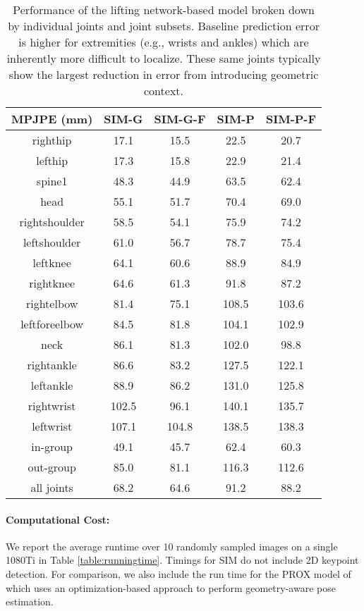 \documentclass[times,referee,twocolumn,final,authoryear]{elsarticle}
\begin{document}
\begin{table}[t]
\small
\begin{center}
\begin{tabular}{c|c|c||c|c}
\hline
MPJPE (mm)   & SIM-G & SIM-G-F & SIM-P & SIM-P-F \\
\hline
righthip & 17.1 & 15.5 & 22.5 & 20.7 \\
\hline
lefthip & 17.3 & 15.8 & 22.9 & 21.4  \\
\hline
spine1 & 48.3 & 44.9 & 63.5 & 62.4  \\
\hline
head & 55.1 & 51.7 & 70.4 & 69.0  \\
\hline
rightshoulder & 58.5 & 54.1 & 75.9 & 74.2   \\
\hline
leftshoulder & 61.0 & 56.7 & 78.7 & 75.4  \\
\hline
leftknee & 64.1 & 60.6 & 88.9 & 84.9  \\
\hline
rightknee & 64.6 & 61.3 & 91.8 & 87.2  \\
\hline
rightelbow & 81.4 & 75.1 & 108.5 & 103.6  \\
\hline
leftforeelbow & 84.5 & 81.8 & 104.1 & 102.9 \\
\hline
neck & 86.1 & 81.3 & 102.0 & 98.8  \\
\hline
rightankle & 86.6 & 83.2 & 127.5 & 122.1  \\
\hline
leftankle & 88.9 & 86.2 & 131.0 & 125.8  \\
\hline
rightwrist & 102.5 & 96.1 & 140.1 & 135.7  \\
\hline
leftwrist & 107.1 & 104.8 & 138.5 & 138.3  \\
\hline
\hline
in-group & 49.1 & 45.7 & 62.4 & 60.3  \\
\hline
out-group & 85.0 & 81.1 & 116.3 & 112.6  \\
\hline
\hline
all joints & 68.2 & 64.6 & 91.2 & 88.2  \\
\hline
\end{tabular}
\end{center}
\caption{Performance of the lifting network-based model \citep{simple} broken down by individual
joints and joint subsets. Baseline prediction error is higher for extremities (e.g., wrists and ankles)
which are inherently more difficult to localize.  These same joints typically show the largest
reduction in error from introducing geometric context.}
\label{table:eachjoint_mpjpe}
\end{table}

\paragraph{Computational Cost:} We report the average runtime over 10 randomly sampled images 
on a single 1080Ti in Table \ref{table:runningtime}. Timings for SIM do not include 2D keypoint
detection.  For comparison, we also include the run time for the PROX model of \cite{mpii_scene} 
which uses an optimization-based approach to perform geometry-aware pose estimation.  
\end{document}
